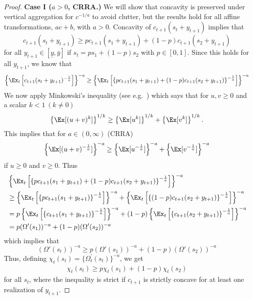 \begin{proof}
	\bigskip
	\noindent \textbf{Case I ($a > 0$, CRRA.)} 	We will show that concavity is preserved under vertical aggregation for $c^{-1/a}$ to avoid clutter, but the results hold for all affine transformations, $ac + b$, with $a>0$. Concavity of $c_{t+1}(s_t + {y}_{t+1})$ implies that
	\begin{equation}c_{t+1}(s_t + {y}_{t+1}) \geq pc_{t+1}(s_1 + {y}_{t+1}) + (1-p) c_{t+1}(s_2 + {y}_{t+1}) \label{eq:vert_crra_conc}\end{equation}
	for all ${y}_{t+1} \in [\underline{y},\bar{y}]$ if $s_t = ps_1 + (1-p)s_2$ with $p \in [0,1]$. Since this holds for all ${y}_{t+1}$, we know that
	\[\left\{\Ex_t\left[c_{t+1}(s_t + {y}_{t+1})^{-\frac{1}{a}}\right]\right\}^{-a} \geq \left\{\Ex_t\left[\left\{pc_{t+1}(s_1 + {y}_{t+1}) + (1-p) c_{t+1}(s_2 + {y}_{t+1})\right\}^{-\frac{1}{a}}\right]\right\}^{-a}\]
	We now apply Minkowski's inequality (see e.g.\ \citealp[Theorem 3]{beckenbach1983inequalities}) which says that for $u,v \geq 0$ and a scalar $k < 1\ (k \neq 0)$
	\[\left\{\Ex[(u + v)^{k}]\right\}^{1/k} \geq \left\{\Ex[u^{k}]\right\}^{1/k} + \left\{\Ex[v^{k}]\right\}^{1/k}.\]
%	
%	
	This implies that for $a \in (0,\infty)$ (CRRA)
	\[\left\{\Ex[(u + v)^{-\frac{1}{a}}]\right\}^{-a} \geq \left\{\Ex[u^{-\frac{1}{a}}]\right\}^{-a} + \left\{\Ex[v^{-\frac{1}{a}}]\right\}^{-a}\]
	if $u\geq 0$ and $v\geq 0$. Thus
	\begin{align*}
	&\left\{ \Ex_t \left[\left\{pc_{t+1}(s_1 + {y}_{t+1}) + (1-p) c_{t+1}(s_2 + {y}_{t+1})\right\}^{-\frac{1}{a}}\right]\right\}^{-a} \\ & \geq \left\{ \Ex_t \left[\left\{pc_{t+1}(s_1 + {y}_{t+1})\right\}^{-\frac{1}{a}}\right]\right\}^{-a} + \left\{ \Ex_t \left[\left\{(1-p) c_{t+1}(s_2 + {y}_{t+1})\right\}^{-\frac{1}{a}}\right]\right\}^{-a} \\
	& = p\left\{ \Ex_t \left[\left\{c_{t+1}(s_1 + {y}_{t+1})\right\}^{-\frac{1}{a}}\right]\right\}^{-a} +(1-p) \left\{ \Ex_t \left[\left\{ c_{t+1}(s_2 + {y}_{t+1})\right\}^{-\frac{1}{a}}\right]\right\}^{-a} \\ & = p(\Omega'(s_1))^{-a} + (1-p)(\Omega'(s_2))^{-a}
	\end{align*}
	which implies that
	\[ (\Omega'(s_t))^{-a} \geq p(\Omega'(s_1))^{-a} + (1-p)(\Omega'(s_2))^{-a}\]	
	Thus, defining
	$\chi_{t}(s_{t}) = \{\Omega_{t}^{'}(s_{t})\}^{-a}$, we get
	\begin{align*}
	\chi_{t}(s_{t}) \geq p \chi_{t}(s_{1}) + (1-p) \chi_{t}(s_{2})
	\end{align*}
	for all $s_{t}$, where the inequality is strict if $c_{t+1}$ is strictly concave for at least one realization of ${y}_{t+1}$.
	

\end{proof}
